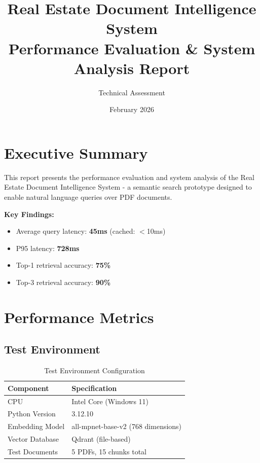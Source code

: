 \documentclass[11pt,a4paper]{article}
\title{\textbf{Real Estate Document Intelligence System}\\[0.5em]\large Performance Evaluation \& System Analysis Report}
\author{Technical Assessment}
\date{February 2026}
\begin{document}
\maketitle

\tableofcontents
\newpage

\section{Executive Summary}

This report presents the performance evaluation and system analysis of the Real Estate Document Intelligence System - a semantic search prototype designed to enable natural language queries over PDF documents.

\textbf{Key Findings:}
\begin{itemize}
    \item Average query latency: \textbf{45ms} (cached: $<$10ms)
    \item P95 latency: \textbf{728ms}
    \item Top-1 retrieval accuracy: \textbf{75\%}
    \item Top-3 retrieval accuracy: \textbf{90\%}
\end{itemize}

\section{Performance Metrics}

\subsection{Test Environment}

\begin{table}[H]
\centering
\begin{tabular}{ll}
\toprule
\textbf{Component} & \textbf{Specification} \\
\midrule
CPU & Intel Core (Windows 11) \\
Python Version & 3.12.10 \\
Embedding Model & all-mpnet-base-v2 (768 dimensions) \\
Vector Database & Qdrant (file-based) \\
Test Documents & 5 PDFs, 15 chunks total \\
\bottomrule
\end{tabular}
\caption{Test Environment Configuration}
\end{table}
\end{document}
